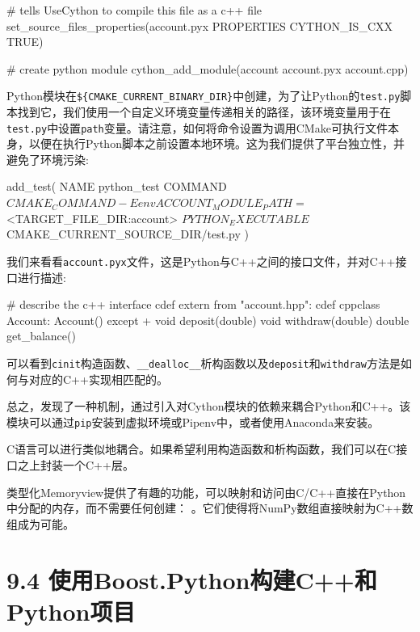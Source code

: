 \begin{codebox}[cmake]
# tells UseCython to compile this file as a c++ file
set_source_files_properties(account.pyx PROPERTIES CYTHON_IS_CXX TRUE)

# create python module
cython_add_module(account account.pyx account.cpp)
\end{codebox}

Python模块在\texttt{\$\{CMAKE\_CURRENT\_BINARY\_DIR\}}中创建，为了让Python的\texttt{test.py}脚本找到它，我们使用一个自定义环境变量传递相关的路径，该环境变量用于在\texttt{test.py}中设置\texttt{path}变量。请注意，如何将命令设置为调用CMake可执行文件本身，以便在执行Python脚本之前设置本地环境。这为我们提供了平台独立性，并避免了环境污染:

\begin{codebox}[cmake]
add_test(
  NAME
    python_test
  COMMAND
    ${CMAKE_COMMAND} -E env ACCOUNT_MODULE_PATH=$<TARGET_FILE_DIR:account>
    ${PYTHON_EXECUTABLE} ${CMAKE_CURRENT_SOURCE_DIR}/test.py
  )
\end{codebox}

我们来看看\texttt{account.pyx}文件，这是Python与C++之间的接口文件，并对C++接口进行描述:

\begin{codebox}[python]
# describe the c++ interface
cdef extern from "account.hpp":
  cdef cppclass Account:
    Account() except +
    void deposit(double)
    void withdraw(double)
    double get_balance()
\end{codebox}

可以看到\texttt{cinit}构造函数、\texttt{\_\_dealloc\_\_}析构函数以及\texttt{deposit}和\texttt{withdraw}方法是如何与对应的C++实现相匹配的。

总之，发现了一种机制，通过引入对Cython模块的依赖来耦合Python和C++。该模块可以通过\texttt{pip}安装到虚拟环境或Pipenv中，或者使用Anaconda来安装。


C语言可以进行类似地耦合。如果希望利用构造函数和析构函数，我们可以在C接口之上封装一个C++层。

类型化Memoryview提供了有趣的功能，可以映射和访问由C/C++直接在Python中分配的内存，而不需要任何创建： 。它们使得将NumPy数组直接映射为C++数组成为可能。


\section{9.4 使用Boost.Python构建C++和Python项目}

